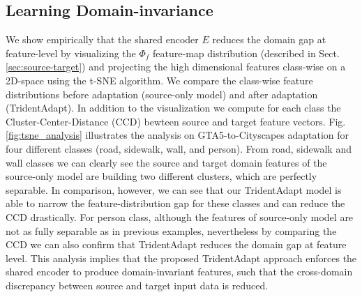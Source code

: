 \documentclass{bmvc2k}
\newcommand{\Fig}[1]{Fig. \ref{fig:#1}}
\newcommand{\Sect}[1]{Sect. \ref{sec:#1}}
\begin{document}
\subsection{Learning Domain-invariance} 
We show empirically that the shared encoder $E$ reduces the domain gap at feature-level by 
visualizing the ${\Phi_f}$ feature-map distribution (described in \Sect{source-target}) and projecting the high dimensional features class-wise on a 2D-space using the t-SNE \cite{vanDerMaaten2008} algorithm. We compare the class-wise feature distributions before adaptation (source-only model) and after adaptation (TridentAdapt). In addition to the visualization we compute for each class the Cluster-Center-Distance (CCD) bewteen source and target feature vectors.  \Fig{tsne_analysis} illustrates the analysis on GTA5-to-Cityscapes adaptation for four different classes (road, sidewalk, wall, and person). From road, sidewalk and wall classes we can clearly see the source and target domain features of the source-only model are building two different clusters, which are perfectly separable. In comparison, however, we can see that our TridentAdapt model is able to narrow the feature-distribution gap for these classes and can reduce the CCD drastically. For person class, although the features of source-only model are not as fully separable as in previous examples, nevertheless by comparing the CCD we can also confirm that TridentAdapt reduces the domain gap at feature level. This analysis implies that the proposed TridentAdapt approach enforces the shared encoder to produce domain-invariant features, such that the cross-domain discrepancy between source and target input data is reduced. 
\end{document}
